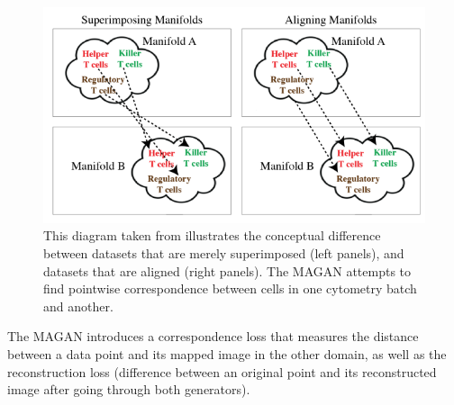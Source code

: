 \begin{figure}[H]
\label{fig:magan}
    \centering
    \includegraphics[width=\textwidth]{images/review/magan.png}
    \caption{
        This diagram taken from \cite{magan} illustrates the conceptual difference between datasets that are merely superimposed (left panels), and datasets that are aligned (right panels). The MAGAN attempts to find pointwise correspondence between cells in one cytometry batch and another. 
    }
\end{figure}

The MAGAN introduces a correspondence loss that measures the distance between a data point and its mapped image in the other domain, as well as the reconstruction loss (difference between an original point and its reconstructed image after going through both generators). %


